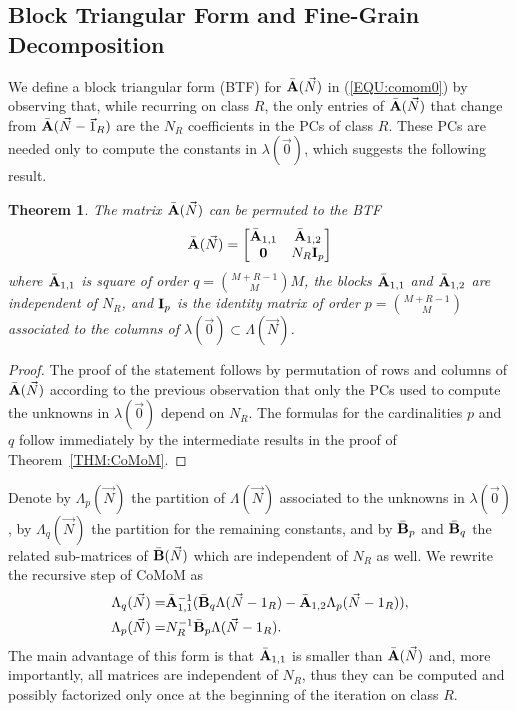 \documentclass[journal,twocolumn,9.5pt]{IEEEtran}
\newtheorem{theorem}{Theorem}
\newcommand{\comom}[1]{\bar{#1}}
\begin{document}
\subsection{Block Triangular Form and Fine-Grain Decomposition}
\label{SEC:btf}
We define a block triangular form (BTF) for $\comom{\bf A}(\vec N)$ in (\ref{EQU:comom0}) by observing that, while recurring on class $R$, the only entries of $\comom{\bf A}(\vec N)$ that change from $\comom{\bf A}(\vec N-\vec 1_R)$ are the $N_R$ coefficients in the PCs of class $R$. These PCs are needed only to compute the  constants in $\lambda(\vec 0)$, which suggests the following result.
\begin{theorem}
\label{THM:btf}
{\em The matrix $\comom{\bf A}(\vec N)$ can be permuted to the BTF
\begin{equation}
\label{EQU:btf}
\comom{\bf A}(\vec N)=
\begin{bmatrix}
\comom{\bf A}_{1,1} & \comom{\bf A}_{1,2} \\
{\bf 0} & N_R{\bf I}_{p} \\
\end{bmatrix}
\end{equation}
where $\comom{\bf A}_{1,1}$ is square of order $q={M+R-1\choose M}M$, the blocks $\comom{\bf A}_{1,1}$ and $\comom{\bf A}_{1,2}$ are independent of $N_R$, and ${\bf I}_{p}$ is the identity matrix of order $p={M+R-1\choose M}$ associated to the columns of $\lambda(\vec 0) \subset \Lambda(\vec N)$.
}\end{theorem}
\begin{proof}
{\rm The proof of the statement follows by permutation of rows and columns of $\comom{\bf A}(\vec N)$ according to the previous observation that only the PCs used to compute the unknowns in $\lambda(\vec 0)$ depend on $N_R$. The formulas for the cardinalities $p$ and $q$ follow immediately by the intermediate results in the proof of Theorem~\ref{THM:CoMoM}.}
\end{proof}
Denote by $\Lambda_p(\vec N)$ the partition of $\Lambda(\vec N)$ associated to the unknowns in $\lambda(\vec 0)$, by $\Lambda_q(\vec N)$ the partition for the remaining constants, and by $\comom{\bf B}_{p}$ and $\comom{\bf B}_{q}$ the related sub-matrices of $\comom{\bf B}(\vec N)$ which are independent of $N_R$ as well. We rewrite the recursive step of CoMoM as
\begin{align}
\label{EQU:btfCoMoM}
\Lambda_q(\vec N)=&\comom{\bf A}^{-1}_{1,1}(\comom{\bf B}_{q}\Lambda(\vec N-1_R)-\comom{\bf A}_{1,2}\Lambda_p(\vec N-1_R)),\\
\Lambda_p(\vec N)=&N_R^{-1}\comom{\bf B}_{p}\Lambda(\vec N-1_R).
\end{align}
The main advantage of this form is that $\comom{\bf A}_{1,1}$ is smaller than $\comom{\bf A}(\vec N)$ and, more importantly, all matrices are independent of $N_R$, thus they can be computed and possibly factorized only once at the beginning of the iteration on class $R$.
\end{document}
